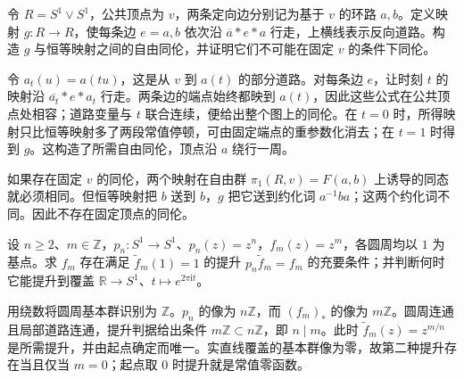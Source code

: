 \BookExercises

\begin{exercise}\label{g2:ex:free-homotopy-basepoint}
	令 \(R=S^1\vee S^1\)，公共顶点为 \(v\)，两条定向边分别记为基于 \(v\) 的环路 \(a,b\)。定义映射 \(g:R\to R\)，使每条边 \(e=a,b\) 依次沿 \(\overline a*e*a\) 行走，上横线表示反向道路。构造 \(g\) 与恒等映射之间的自由同伦，并证明它们不可能在固定 \(v\) 的条件下同伦。
\end{exercise}
\begin{solution}
	令 \(a_t(u)=a(tu)\)，这是从 \(v\) 到 \(a(t)\) 的部分道路。对每条边 \(e\)，让时刻 \(t\) 的映射沿 \(\overline{a_t}*e*a_t\) 行走。两条边的端点始终都映到 \(a(t)\)，因此这些公式在公共顶点处相容；道路变量与 \(t\) 联合连续，便给出整个图上的同伦。在 \(t=0\) 时，所得映射只比恒等映射多了两段常值停顿，可由固定端点的重参数化消去；在 \(t=1\) 时得到 \(g\)。这构造了所需自由同伦，顶点沿 \(a\) 绕行一周。

	如果存在固定 \(v\) 的同伦，两个映射在自由群 \(\pi_1(R,v)=F(a,b)\) 上诱导的同态就必须相同。但恒等映射把 \(b\) 送到 \(b\)，\(g\) 把它送到约化词 \(a^{-1}ba\)；这两个约化词不同。因此不存在固定顶点的同伦。
\end{solution}

\begin{exercise}\label{g2:ex:circle-lift-divisibility}
	设 \(n\ge2\)、\(m\in\mathbb Z\)，\(p_n:S^1\to S^1\)、\(p_n(z)=z^n\)，\(f_m(z)=z^m\)，各圆周均以 \(1\) 为基点。求 \(f_m\) 存在满足 \(\widetilde f_m(1)=1\) 的提升 \(p_n\widetilde f_m=f_m\) 的充要条件；并判断何时它能提升到覆盖 \(\mathbb R\to S^1\)、\(t\mapsto e^{2\pi\mathrm{i}t}\)。
\end{exercise}
\begin{solution}
	用绕数将圆周基本群识别为 \(\mathbb Z\)。\(p_n\) 的像为 \(n\mathbb Z\)，而 \((f_m)_*\) 的像为 \(m\mathbb Z\)。圆周连通且局部道路连通，提升判据给出条件 \(m\mathbb Z\subset n\mathbb Z\)，即 \(n\mid m\)。此时 \(\widetilde f_m(z)=z^{m/n}\) 是所需提升，并由起点确定而唯一。实直线覆盖的基本群像为零，故第二种提升存在当且仅当 \(m=0\)；起点取 \(0\) 时提升就是常值零函数。
\end{solution}

